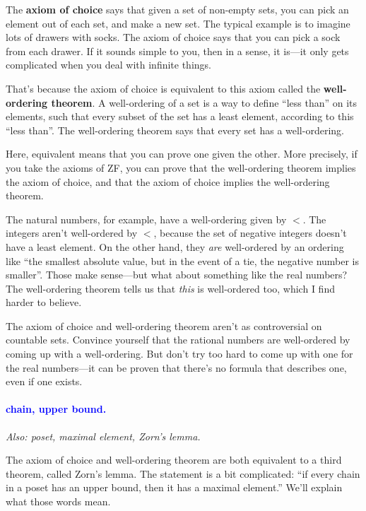 \documentclass[11pt,paper=letter]{scrartcl}
\renewcommand{\bluebf}[1]{{\bfseries \color{Blue} #1}}
\renewcommand\wp[1]{\paragraph{\textcolor{Blue}{#1.}} \hspace{-1em}}
\newcommand\wl[1]{\label{w:#1}}
\newcommand\oww[1]{\textit{Also: #1.}}
\begin{document}
The \bluebf{axiom of choice} says that given a set of non-empty sets, you can pick an element out of each set, and make a new set. The typical example is to imagine lots of drawers with socks. The axiom of choice says that you can pick a sock from each drawer. If it sounds simple to you, then in a sense, it is---it only gets complicated when you deal with infinite things.

That's because the axiom of choice is equivalent to this axiom called the \textbf{well-ordering theorem}. A well-ordering of a set is a way to define ``less than'' on its elements, such that every subset of the set has a least element, according to this ``less than''. The well-ordering theorem says that every set has a well-ordering.

\begin{remboxed}
  Here, equivalent means that you can prove one given the other. More precisely, if you take the axioms of ZF, you can prove that the well-ordering theorem implies the axiom of choice, and that the axiom of choice implies the well-ordering theorem.
\end{remboxed}

The natural numbers, for example, have a well-ordering given by $<$. The integers aren't well-ordered by $<$, because the set of negative integers doesn't have a least element. On the other hand, they \textit{are} well-ordered by an ordering like ``the smallest absolute value, but in the event of a tie, the negative number is smaller''. Those make sense---but what about something like the real numbers? The well-ordering theorem tells us that \textit{this} is well-ordered too, which I find harder to believe.

\begin{exrboxed}
  The axiom of choice and well-ordering theorem aren't as controversial on countable sets. Convince yourself that the rational numbers are well-ordered by coming up with a well-ordering. But don't try too hard to come up with one for the real numbers---it can be proven that there's no formula that describes one, even if one exists.
\end{exrboxed}

\wp{chain, upper bound}
\wl{chain}
\wl{upper bound}
\oww{poset, maximal element, Zorn's lemma}

The axiom of choice and well-ordering theorem are both equivalent to a third theorem, called Zorn's lemma. The statement is a bit complicated: ``if every chain in a poset has an upper bound, then it has a maximal element.'' We'll explain what those words mean.
\end{document}
